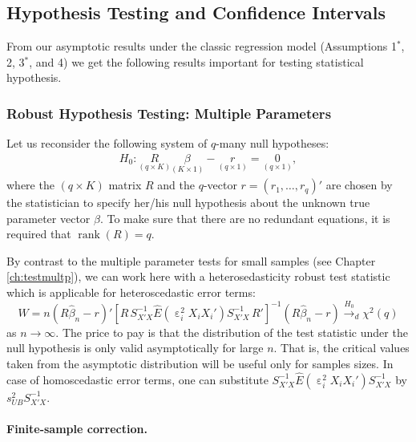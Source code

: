 \documentclass[
  14pt,
]{memoir}
\DeclareMathOperator{\rank}{rank}
\DeclareMathOperator{\eps}{\varepsilon}
\begin{document}
\hypertarget{hypothesis-testing-and-confidence-intervals}{%
\subsection{Hypothesis Testing and Confidence Intervals}\label{hypothesis-testing-and-confidence-intervals}}

From our asymptotic results under the classic regression model (Assumptions 1\(^\ast\), 2, 3\(^\ast\), and 4) we get the following results important for testing statistical hypothesis.

\hypertarget{robust-hypothesis-testing-multiple-parameters}{%
\subsubsection{Robust Hypothesis Testing: Multiple Parameters}\label{robust-hypothesis-testing-multiple-parameters}}

Let us reconsider the following system of \(q\)-many null hypotheses:
\begin{align*}
H_0: \underset{(q\times K)}{R}\underset{(K\times 1)}{\beta} - \underset{(q\times 1)}{r} = \underset{(q\times 1)}{0},
\end{align*}
where the \((q \times K)\) matrix \(R\) and the \(q\)-vector \(r=(r_{1},\dots,r_{q})'\) are chosen by the statistician to specify her/his null hypothesis about the unknown true parameter vector \(\beta\). To make sure that there are no redundant equations, it is required that \(\rank(R)=q\).

By contrast to the multiple parameter tests for small samples (see Chapter \ref{ch:testmultp}), we can work here with a heterosedasticity robust test statistic which is applicable for heteroscedastic error terms:
\begin{equation}\label{Ftestasymp}
W=n(R\hat\beta_n -r)'[R\,S_{X'X}^{-1}\widehat{E}(\eps^2_iX_iX_i')S^{-1}_{X'X}\,R']^{-1}(R\hat\beta_n-r)\overset{H_0}{\to}_d\chi^2(q)
\end{equation}
as \(n\to\infty\). The price to pay is that the distribution of the test statistic under the null hypothesis is only valid asymptotically for large \(n\). That is, the critical values taken from the asymptotic distribution will be useful only for  samples sizes. In case of homoscedastic error terms, one can substitute \(S_{X'X}^{-1}\widehat{E}(\eps^2_iX_iX_i')S^{-1}_{X'X}\) by \(s_{UB}^2S_{X'X}^{-1}\).

\paragraph*{Finite-sample correction.}
\end{document}
